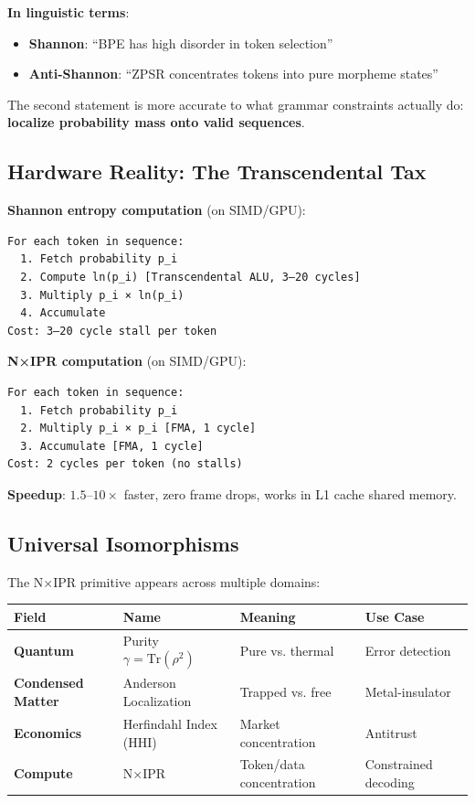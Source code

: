 \documentclass[11pt,oneside]{article}
\begin{document}
\textbf{In linguistic terms}:
\begin{itemize}
  \item \textbf{Shannon}: ``BPE has high disorder in token selection''
  \item \textbf{Anti-Shannon}: ``ZPSR concentrates tokens into pure morpheme states''
\end{itemize}

The second statement is more accurate to what grammar constraints actually do: \textbf{localize probability mass onto valid sequences}.

\subsection{Hardware Reality: The Transcendental Tax}

\textbf{Shannon entropy computation} (on SIMD/GPU):
\begin{lstlisting}
For each token in sequence:
  1. Fetch probability p_i
  2. Compute ln(p_i) [Transcendental ALU, 3–20 cycles]
  3. Multiply p_i × ln(p_i)
  4. Accumulate
Cost: 3–20 cycle stall per token
\end{lstlisting}

\textbf{N×IPR computation} (on SIMD/GPU):
\begin{lstlisting}
For each token in sequence:
  1. Fetch probability p_i
  2. Multiply p_i × p_i [FMA, 1 cycle]
  3. Accumulate [FMA, 1 cycle]
Cost: 2 cycles per token (no stalls)
\end{lstlisting}

\textbf{Speedup}: $1.5$--$10\times$ faster, zero frame drops, works in L1 cache shared memory.

\subsection{Universal Isomorphisms}

The N×IPR primitive appears across multiple domains:

\begin{center}
\begin{tabular}{llll}
\toprule
Field & Name & Meaning & Use Case \\
\midrule
\textbf{Quantum} & Purity $\gamma = \text{Tr}(\rho^2)$ & Pure vs. thermal & Error detection \\
\textbf{Condensed Matter} & Anderson Localization & Trapped vs. free & Metal-insulator \\
\textbf{Economics} & Herfindahl Index (HHI) & Market concentration & Antitrust \\
\textbf{Compute} & N×IPR & Token/data concentration & Constrained decoding \\
\bottomrule
\end{tabular}
\end{center}
\end{document}

